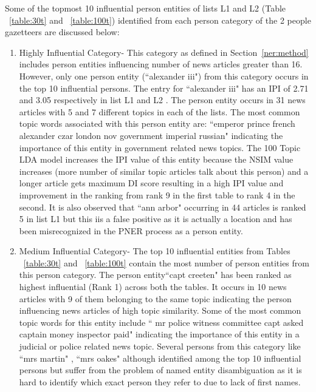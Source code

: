 Some of the topmost 10 influential person entities of lists L1 and L2  (Table ~\ref{table:30t} and ~\ref{table:100t}) identified from each person category of the 2 people gazetteers are discussed below: 
\begin{enumerate}

\item
Highly Influential Category- This category as defined in Section~\ref{ner:method} includes person entities influencing number of news articles greater than 16. However, only one person entity (``alexander iii") from this category occurs in the top 10 influential persons. The entry for ``alexander iii" has an IPI of 2.71 and 3.05 respectively in list L1 and L2 . The person entity occurs in 31 news articles with 5 and 7 different topics in each of the lists. The most common topic words associated with this person entity are: ``emperor prince french alexander czar london nov government imperial russian" indicating the importance of this entity in government related news topics. The 100 Topic LDA model increases the IPI value of this entity because the NSIM value increases (more number of similar topic articles talk about this person) and a longer article gets maximum DI score resulting in a high IPI value and improvement in the ranking from rank 9 in the first table to rank 4 in the second.
It is also observed that ``ann arbor" occurring in 44 articles is ranked 5 in list L1 but this iis a false positive as it is actually a location and has been misrecognized in the PNER process as a person entity. 

\item
Medium Influential Category- The top 10 influential entities from Tables ~\ref{table:30t} and ~\ref{table:100t} contain the most number of person entities from this person category. The person entity``capt creeten" has been ranked as highest influential (Rank 1) across both the tables. It occurs in 10 news articles with 9 of them belonging to the same topic indicating the person influencing news articles of high topic similarity. Some of the most common topic words for this entity include `` mr police witness committee capt asked captain money inspector paid" indicating the importance of this entity in a judicial or police related news topic.
Several persons from this category like ``mrs martin" , ``mrs oakes"  although identified among the top 10 influential persons but suffer from the problem of named entity disambiguation as it is hard to identify which exact person they refer to due to lack of first names.
 

\end{enumerate}

